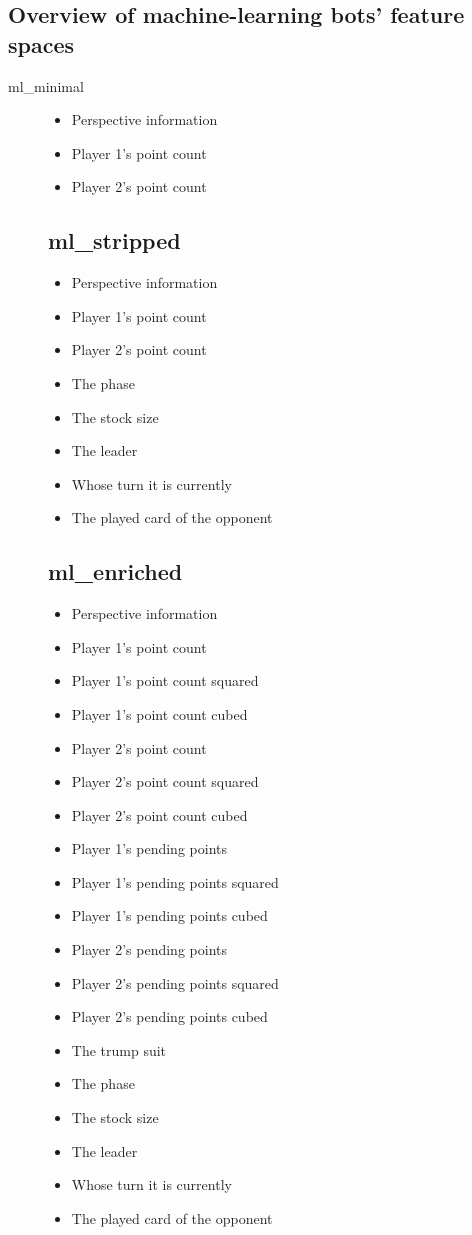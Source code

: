 \documentclass[a4paper,11pt]{article}
\begin{document}
\subsection{Overview of machine-learning bots' feature spaces}
\begin{description}
\item[ml\_minimal]

\begin{itemize}


\item Perspective information
\item Player 1's point count
\item Player 2's point count
\end{itemize}
\subsection{ml\_stripped}
\begin{itemize}
\item Perspective information
\item Player 1's point count
\item Player 2's point count
\item The phase
\item The stock size
\item The leader
\item Whose turn it is currently
\item The played card of the opponent
\end{itemize}
\subsection{ml\_enriched}
\begin{itemize}
\item Perspective information
\item Player 1's point count
\item Player 1's point count squared
\item Player 1's point count cubed
\item Player 2's point count
\item Player 2's point count squared
\item Player 2's point count cubed
\item Player 1's pending points
\item Player 1's pending points squared
\item Player 1's pending points cubed
\item Player 2's pending points
\item Player 2's pending points squared
\item Player 2's pending points cubed
\item The trump suit
\item The phase
\item The stock size
\item The leader
\item Whose turn it is currently
\item The played card of the opponent
\end{itemize}

\end{description}
\end{document}
